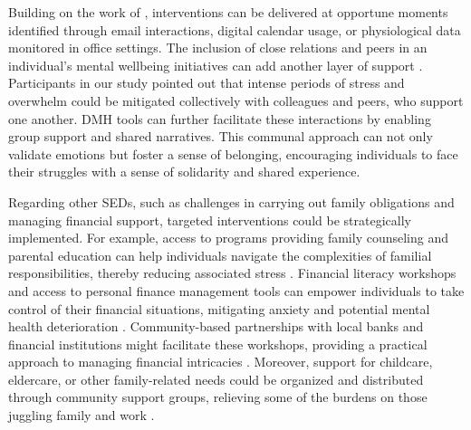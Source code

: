 Building on the work of \citet{howe2022design}, interventions can be delivered at opportune moments identified through email interactions, digital calendar usage, or physiological data monitored in office settings. The inclusion of close relations and peers in an individual's mental wellbeing initiatives can add another layer of support \cite{bhattacharjee2022kind, burgess2019think}. Participants in our study pointed out that intense periods of stress and overwhelm could be mitigated collectively with colleagues and peers, who support one another. DMH tools can further facilitate these interactions by enabling group support and shared narratives. This communal approach can not only validate emotions but foster a sense of belonging, encouraging individuals to face their struggles with a sense of solidarity and shared experience. 

Regarding other SEDs, such as challenges in carrying out family obligations and managing financial support, targeted interventions could be strategically implemented. For example, access to programs providing family counseling and parental education can help individuals navigate the complexities of familial responsibilities, thereby reducing associated stress \cite{chi2015systematic, smout2023enabling}. Financial literacy workshops and access to personal finance management tools can empower individuals to take control of their financial situations, mitigating anxiety and potential mental health deterioration \cite{boyd2016earned, mehra2018prayana}. Community-based partnerships with local banks and financial institutions might facilitate these workshops, providing a practical approach to managing financial intricacies \cite{dillahunt2022village, moulder2014hci}. Moreover, support for childcare, eldercare, or other family-related needs could be organized and distributed through community support groups, relieving some of the burdens on those juggling family and work \cite{gisore2012community, butler2012relationship, compton2015social, smout2023enabling}.












